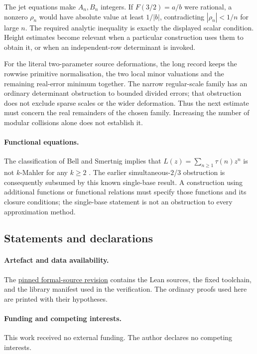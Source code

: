 \documentclass[11pt]{article}
\begin{document}
The jet equations make $A_n,B_n$ integers.  If $F(3/2)=a/b$ were rational,
a nonzero $\rho_n$ would have absolute value at least $1/|b|$, contradicting
$|\rho_n|<1/n$ for large $n$.
The required analytic inequality is exactly the displayed scalar condition.
Height estimates become relevant when a particular construction uses them
to obtain it, or when an independent-row determinant is invoked.

For the literal two-parameter source deformations, the long record keeps
the rowwise primitive normalisation, the two local minor valuations and the
remaining real-error minimum together.  The narrow regular-scale family has
an ordinary determinant obstruction to bounded divided errors; that
obstruction does not exclude sparse scales or the wider deformation.
Thus the next estimate must concern the real remainders of the chosen family.
Increasing the number of modular collisions alone does not establish it.

\paragraph{Functional equations.}
The classification of Bell and Smertnig implies that
$L(z)=\sum_{n\ge1}\tau(n)z^n$ is not $k$-Mahler for any $k\ge2$
\cite[Introduction]{bellsmertnig2026}.
The earlier simultaneous-$2$/$3$ obstruction is consequently subsumed by
this known single-base result.  A construction using additional functions or
functional relations must specify those functions and its closure conditions;
the single-base statement is not an obstruction to every approximation method.

\subsection*{Statements and declarations}

\paragraph{Artefact and data availability.} The
\href{\sourceurl}{pinned formal-source revision} contains the Lean sources, the
fixed toolchain, and the library manifest used in the verification.  The ordinary proofs used here are printed with their hypotheses.

\paragraph{Funding and competing interests.} This work received no external
funding.  The author declares no competing interests.
\end{document}

